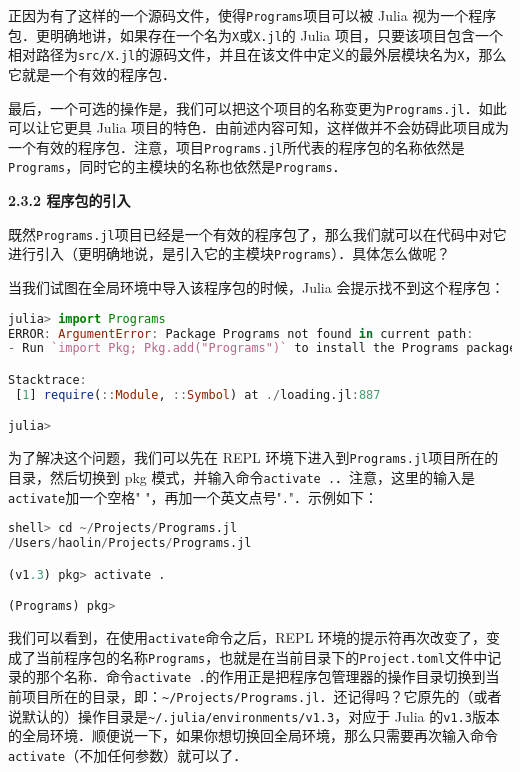 正因为有了这样的一个源码文件，使得\verb|Programs|项目可以被 Julia 视为一个程序包．更明确地讲，如果存在一个名为\verb|X|或\verb|X.jl|的 Julia 项目，只要该项目包含一个相对路径为\verb|src/X.jl|的源码文件，并且在该文件中定义的最外层模块名为\verb|X|，那么它就是一个有效的程序包．

最后，一个可选的操作是，我们可以把这个项目的名称变更为\verb|Programs.jl|．如此可以让它更具 Julia 项目的特色．由前述内容可知，这样做并不会妨碍此项目成为一个有效的程序包．注意，项目\verb|Programs.jl|所代表的程序包的名称依然是\verb|Programs|，同时它的主模块的名称也依然是\verb|Programs|．

\textbf{2.3.2 程序包的引入}

既然\verb|Programs.jl|项目已经是一个有效的程序包了，那么我们就可以在代码中对它进行引入（更明确地说，是引入它的主模块\verb|Programs|）．具体怎么做呢？

当我们试图在全局环境中导入该程序包的时候，Julia 会提示找不到这个程序包：

\begin{lstlisting}[language=julia]
julia> import Programs
ERROR: ArgumentError: Package Programs not found in current path:
- Run `import Pkg; Pkg.add("Programs")` to install the Programs package.

Stacktrace:
 [1] require(::Module, ::Symbol) at ./loading.jl:887

julia> 
\end{lstlisting}

为了解决这个问题，我们可以先在 REPL 环境下进入到\verb|Programs.jl|项目所在的目录，然后切换到 pkg 模式，并输入命令\verb|activate .|．注意，这里的输入是\verb|activate|加一个空格" "，再加一个英文点号"\verb|.|"．示例如下：

\begin{lstlisting}[language=julia]
shell> cd ~/Projects/Programs.jl
/Users/haolin/Projects/Programs.jl

(v1.3) pkg> activate .

(Programs) pkg> 
\end{lstlisting}

我们可以看到，在使用\verb|activate|命令之后，REPL 环境的提示符再次改变了，变成了当前程序包的名称\verb|Programs|，也就是在当前目录下的\verb|Project.toml|文件中记录的那个名称．命令\verb|activate .|的作用正是把程序包管理器的操作目录切换到当前项目所在的目录，即：\verb|~/Projects/Programs.jl|．还记得吗？它原先的（或者说默认的）操作目录是\verb|~/.julia/environments/v1.3|，对应于 Julia 的\verb|v1.3|版本的全局环境．顺便说一下，如果你想切换回全局环境，那么只需要再次输入命令\verb|activate|（不加任何参数）就可以了．

